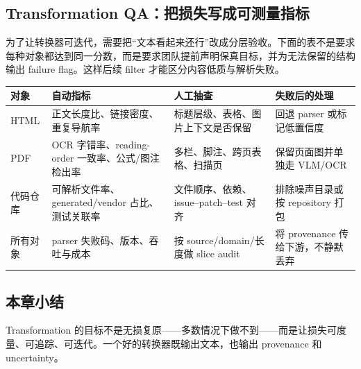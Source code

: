 \subsection{Transformation QA：把损失写成可测量指标}

为了让转换器可迭代，需要把“文本看起来还行”改成分层验收。下面的表不是要求每种对象都达到同一分数，而是要求团队提前声明保真目标，并为无法保留的结构输出 failure flag。这样后续 filter 才能区分内容低质与解析失败。

\begin{longtable}{L{0.17\textwidth}L{0.24\textwidth}L{0.24\textwidth}L{0.21\textwidth}}
\toprule
对象 & 自动指标 & 人工抽查 & 失败后的处理 \\
\midrule
HTML & 正文长度比、链接密度、重复导航率 & 标题层级、表格、图片上下文是否保留 & 回退 parser 或标记低置信度 \\
PDF & OCR 字错率、reading-order 一致率、公式/图注检出率 & 多栏、脚注、跨页表格、扫描页 & 保留页面图并单独走 VLM/OCR \\
代码仓库 & 可解析文件率、generated/vendor 占比、测试关联率 & 文件顺序、依赖、issue--patch--test 对齐 & 排除噪声目录或按 repository 打包 \\
所有对象 & parser 失败码、版本、吞吐与成本 & 按 source/domain/长度做 slice audit & 将 provenance 传给下游，不静默丢弃 \\
\bottomrule
\end{longtable}

\subsection{本章小结}

Transformation 的目标不是无损复原——多数情况下做不到——而是让损失可度量、可追踪、可迭代。一个好的转换器既输出文本，也输出 provenance 和 uncertainty。

